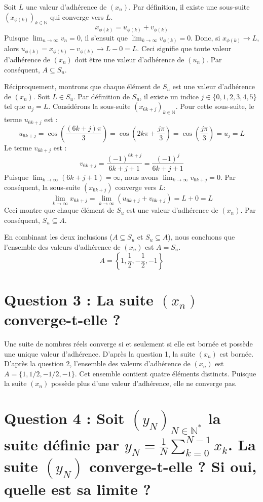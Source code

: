 \documentclass{report}
\begin{document}
Soit $L$ une valeur d'adhérence de $(x_n)$. Par définition, il existe une sous-suite $(x_{\phi(k)})_{k \in \mathbb{N}}$ qui converge vers $L$.
$$x_{\phi(k)} = u_{\phi(k)} + v_{\phi(k)}$$
Puisque $\lim_{n \to \infty} v_n = 0$, il s'ensuit que $\lim_{k \to \infty} v_{\phi(k)} = 0$.
Donc, si $x_{\phi(k)} \to L$, alors $u_{\phi(k)} = x_{\phi(k)} - v_{\phi(k)} \to L - 0 = L$.
Ceci signifie que toute valeur d'adhérence de $(x_n)$ doit être une valeur d'adhérence de $(u_n)$.
Par conséquent, $A \subseteq S_u$.

Réciproquement, montrons que chaque élément de $S_u$ est une valeur d'adhérence de $(x_n)$.
Soit $L \in S_u$. Par définition de $S_u$, il existe un indice $j \in \{0, 1, 2, 3, 4, 5\}$ tel que $u_j = L$.
Considérons la sous-suite $(x_{6k+j})_{k \in \mathbb{N}}$.
Pour cette sous-suite, le terme $u_{6k+j}$ est :
$$u_{6k+j} = \cos\left(\frac{(6k+j)\pi}{3}\right) = \cos\left(2k\pi + \frac{j\pi}{3}\right) = \cos\left(\frac{j\pi}{3}\right) = u_j = L$$
Le terme $v_{6k+j}$ est :
$$v_{6k+j} = \frac{(-1)^{6k+j}}{6k+j+1} = \frac{(-1)^j}{6k+j+1}$$
Puisque $\lim_{k \to \infty} (6k+j+1) = \infty$, nous avons $\lim_{k \to \infty} v_{6k+j} = 0$.
Par conséquent, la sous-suite $(x_{6k+j})$ converge vers $L$:
$$\lim_{k \to \infty} x_{6k+j} = \lim_{k \to \infty} (u_{6k+j} + v_{6k+j}) = L + 0 = L$$
Ceci montre que chaque élément de $S_u$ est une valeur d'adhérence de $(x_n)$.
Par conséquent, $S_u \subseteq A$.

En combinant les deux inclusions ($A \subseteq S_u$ et $S_u \subseteq A$), nous concluons que l'ensemble des valeurs d'adhérence de $(x_n)$ est $A = S_u$.
$$A = \left\{1, \frac{1}{2}, -\frac{1}{2}, -1\right\}$$

\section*{Question 3 : La suite $(x_n)$ converge-t-elle ?}

Une suite de nombres réels converge si et seulement si elle est bornée et possède une unique valeur d'adhérence.
D'après la question 1, la suite $(x_n)$ est bornée.
D'après la question 2, l'ensemble des valeurs d'adhérence de $(x_n)$ est $A = \{1, 1/2, -1/2, -1\}$.
Cet ensemble contient quatre éléments distincts.
Puisque la suite $(x_n)$ possède plus d'une valeur d'adhérence, elle ne converge pas.

\section*{Question 4 : Soit $(y_N)_{N \in \mathbb{N}^*}$ la suite définie par $y_N = \frac{1}{N} \sum_{k=0}^{N-1} x_k$. La suite $(y_N)$ converge-t-elle ? Si oui, quelle est sa limite ?}
\end{document}
